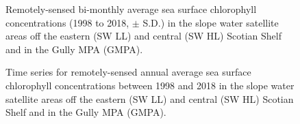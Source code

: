 \documentclass[12pt]{article}\usepackage[]{graphicx}\usepackage[]{color}
\begin{document}
\begin{figure}[htb]

{\centering {} 

}

\caption{Remotely-sensed bi-monthly average sea surface chlorophyll concentrations (1998 to 2018, \(\pm\) S.D.) in the slope water satellite areas off the eastern (SW LL) and central (SW HL) Scotian Shelf and in the Gully MPA (GMPA).}\label{fig:figure25}
\end{figure}
\clearpage


\begin{figure}[htb]

{\centering {} 

}

\caption{Time series for remotely-sensed annual average sea surface chlorophyll concentrations between 1998 and 2018 in the slope water satellite areas off the eastern (SW LL) and central (SW HL) Scotian Shelf and in the Gully MPA (GMPA).}\label{fig:figure26}
\end{figure}
\clearpage
\end{document}
